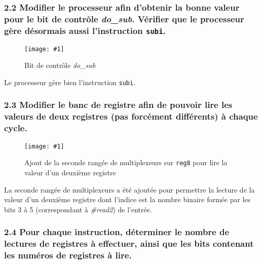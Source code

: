 \documentclass[twoside, 12pt, a4paper]{article}
\newcommand{\cf}[3]{
    \begin{figure}[!h]
        \centering
        \texttt{[image: \#1]}
    \caption{#3}\label{Fig:#1}
    \end{figure}
}
\newcommand{\hcf}[2]{\cf{#1}{.75}{#2}}
\begin{document}
        \subsubsection*{\textbf{2.2} Modifier le processeur afin d'obtenir la bonne valeur pour le bit de contrôle \textit{do\_sub}. Vérifier que le processeur gère désormais aussi l'instruction \texttt{subi}.}

    \hcf{do_sub.png}{Bit de contrôle \textit{do\_sub}}
    Le processeur gère bien l'instruction \texttt{subi}.

\clearpage
        
        \subsubsection*{\textbf{2.3} Modifier le banc de registre afin de pouvoir lire les valeurs de deux registres (pas forcément différents) à chaque cycle.}

    \hcf{mod_reg8.png}{Ajout de la seconde rangée de multiplexeurs sur \texttt{reg8} pour lire la valeur d'un deuxième registre}

    La seconde rangée de multiplexeurs a été ajoutée pour permettre la lecture de la valeur d'un deuxième registre dont l'indice est la nombre binaire formée par les bits 3 à 5 (correspondant à \textit{\#read2}) de l'entrée.

\clearpage

        \subsubsection*{\textbf{2.4} Pour chaque instruction, déterminer le nombre de lectures de registres à effectuer, ainsi que les bits contenant les numéros de registres à lire.}
\end{document}
